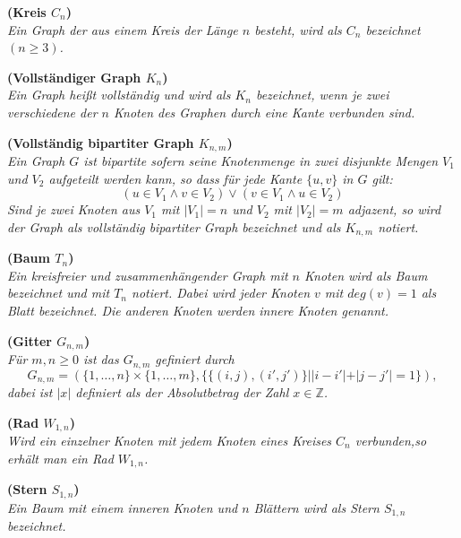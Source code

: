\begin{defi}{\textbf{(Kreis $C_n$)}}\\
\emph{Ein Graph der aus einem Kreis der Länge $n$ besteht, wird als $C_n$ bezeichnet $(n \geq 3)$.} \end{defi}


\begin{defi}{\textbf{(Vollständiger Graph $K_n$)}}\\
\emph{Ein Graph heißt vollständig und wird als $K_n$ bezeichnet, wenn je zwei verschiedene der $n$ Knoten des Graphen durch eine Kante verbunden sind.} 
\end{defi}


\begin{defi}{\textbf{(Vollständig bipartiter Graph $K_{n,m}$)}}\\
\emph{Ein Graph $G$ ist bipartite sofern seine Knotenmenge in zwei disjunkte Mengen $V_1$ und $V_2$ aufgeteilt werden kann, so dass für jede Kante $\{u,v\}$ in $G$ gilt: $$(u \in V_1 \wedge v \in V_2)\vee (v \in V_1 \wedge u \in V_2)$$Sind je zwei Knoten aus $V_1$ mit $|V_1|=n$ und $V_2$ mit $|V_2|=m$ adjazent, so wird der Graph als vollständig bipartiter Graph bezeichnet und als $K_{n,m}$ notiert. } \end{defi}


\begin{defi}{\textbf{(Baum $T_n$)}}\\
\emph{Ein kreisfreier und zusammenhängender Graph mit $n$ Knoten wird als Baum bezeichnet und mit $T_n$ notiert. Dabei wird jeder Knoten $v$ mit $deg(v)=1$ als Blatt bezeichnet. Die anderen Knoten werden innere Knoten genannt.} \end{defi}


\begin{defi}{\textbf{(Gitter $G_{n,m}$)}}\\
\emph{Für $m,n \geq 0$ ist das $G_{n,m}$ gefiniert durch $$G_{n,m}=(\{1,\ldots,n\}\times\{1,\ldots ,m\},\{\{(i,j),(i',j')\}||i-i'|+|j-j'|=1\} ),$$ dabei ist $|x|$ definiert als der Absolutbetrag der Zahl $x \in \mathbb{Z}$. \cite{Exakte Algorithmen für schwere Graphenprobleme}} \end{defi}


\begin{defi}{\textbf{(Rad $W_{1,n}$)}}\\
\emph{Wird ein einzelner Knoten mit jedem Knoten eines Kreises $C_n$ verbunden,so erhält man ein Rad $W_{1,n}$.} \end{defi}


\begin{defi}{\textbf{(Stern $S_{1,n}$)}}\\
\emph{Ein Baum mit einem inneren Knoten und $n$ Blättern wird als Stern $S_{1,n}$ bezeichnet.} \end{defi}

